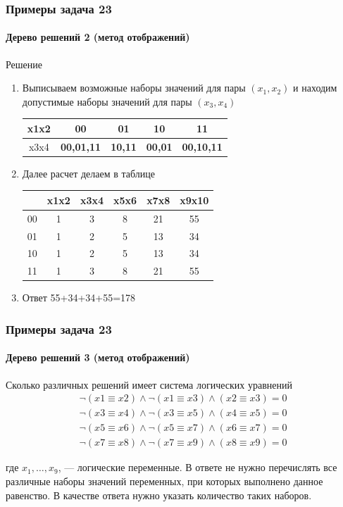 \begin{frame}[t]
\frametitle{Примеры задача 23}
\framesubtitle{Дерево решений 2 (метод отображений)}

\begin{block}{Решение}
\begin{enumerate}
	\item Выписываем возможные наборы значений для пары $(x_1,x_2)$ и находим допустимые наборы значений для пары $(x_3,x_4)$ \\ 	\pause 
\begin{tabular}{|c|c|c|c|c|}
\hline 
x1x2 & 00 & 01 & 10 & 11\tabularnewline
\hline 
\hline 
x3x4 & \textbf{00,01,11} & \textbf{10,11} & \textbf{00,01} & \textbf{00,10,11}\tabularnewline
\hline 
\end{tabular} 	\pause 
\item Далее расчет делаем в таблице\\
\begin{tabular}{|c|c|c|c|c|c|}
\hline 
 & x1x2 & x3x4 & x5x6 & x7x8 & x9x10 \tabularnewline
\hline 
00 & 1 & 3 & 8 & 21 & 55 \tabularnewline
\hline 
01 & 1 & 2 & 5 & 13 & 34 \tabularnewline
\hline 
10 & 1 & 2 & 5 & 13 & 34 \tabularnewline
\hline 
11 & 1 & 3 & 8 & 21 & 55 \tabularnewline
\hline 
\end{tabular}
\item Ответ 55+34+34+55=178
\end{enumerate}
\end{block}
	
\end{frame}


\begin{frame}[t]
\frametitle{Примеры задача 23}
\framesubtitle{Дерево решений 3 (метод отображений)}
Сколько различных решений имеет система логических уравнений 
\begin{align*}
\neg(x1 \equiv x2) \wedge \neg(x1 \equiv x3) \wedge (x2 \equiv x3) = 0\\
\neg(x3 \equiv x4) \wedge \neg(x3 \equiv x5) \wedge (x4 \equiv x5) = 0\\
\neg(x5 \equiv x6) \wedge \neg(x5 \equiv x7) \wedge (x6 \equiv x7) = 0\\
\neg(x7 \equiv x8) \wedge \neg(x7 \equiv x9) \wedge (x8 \equiv x9) = 0
\end{align*}

где $x_1, \ldots, x_{9}$, --- логические переменные. В ответе не нужно перечислять все различные наборы значений переменных, при которых выполнено данное равенство. В качестве ответа нужно указать количество таких наборов.
	
\end{frame}

